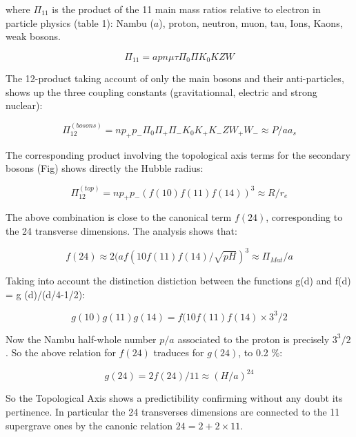 \documentclass[a4paper,9pt]{article}
\begin{document}
where $\Pi_{11}$ is the product of the 11 main mass ratios relative to electron in particle physics (table 1): Nambu ($a$), proton, neutron, muon, tau, Ions, Kaons, weak bosons.  

\begin{equation}
\Pi_{11} = a  p  n  \mu \tau  \Pi_0  \Pi  K_0  K  Z   W 
\end{equation}

The 12-product taking account of only the main bosons and their anti-particles, shows up the three coupling constants (gravitationnal, electric and strong nuclear):


\begin{equation}
\Pi_{12}^{(bosons)} = n p_+ p_-  \Pi_0   \Pi_+    \Pi_-  K_0  K_+  K_- Z   W_+  W_-  \approx P/aa_s
\end{equation}

The corresponding product involving the topological axis terms for the secondary bosons (Fig) shows directly the Hubble radius: 

\begin{equation}
\Pi_{12}^{(top)} = n p_+ p_- (f(10) f(11) f(14))^3 \approx R/r_e
\end{equation}

The above combination is close to the canonical term $f(24)$, corresponding to the 24 transverse dimensions. The analysis shows that:

\begin{equation}
f(24) \approx 2(a f(10 f(11) f(14)/ \sqrt{pH})^3 \approx \Pi_{Mat}/a
\end{equation}

Taking into account the distinction distiction between the functions g(d) and f(d) = g (d)/(d/4-1/2):

\begin{equation}
g(10) g(11)g(14) = f(10 f(11) f(14) \times 3^3/2
\end{equation}

Now the Nambu half-whole number $p/a$ associated to the proton is precisely $3^3/2$. So the above relation for $f(24)$ traduces for $g(24)$, to 0.2 \%:

\begin{equation}
g(24) =  2f(24)/11 \approx (H/a)^{24}
\end{equation}

So the Topological Axis shows a predictibility confirming without any doubt its pertinence. In particular the 24 transverses dimensions are connected to the 11 supergrave ones by the canonic relation $24 = 2 + 2\times 11$.
\end{document}
